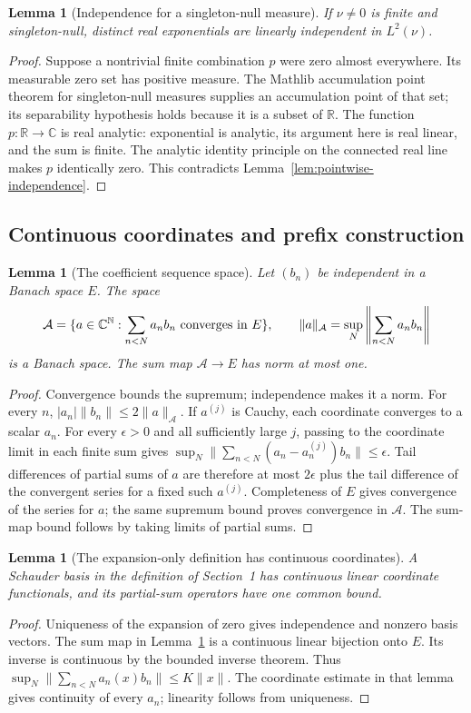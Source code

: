 \documentclass[reqno,a4paper,12pt]{amsart}
\newtheorem{lemma}[theorem]{Lemma}
\theoremstyle{definition}
\newcommand{\R}{\mathbb R}
\newcommand{\C}{\mathbb C}
\newcommand{\N}{\mathbb N}
\begin{document}
\begin{lemma}[Independence for a singleton-null measure]
\label{lem:real-independence}
If $\nu\ne0$ is finite and singleton-null, distinct real exponentials
are linearly independent in $L^2(\nu)$.
\end{lemma}
\begin{proof}
Suppose a nontrivial finite combination $p$ were zero almost everywhere.
Its measurable zero set has positive measure. The Mathlib accumulation
point theorem for singleton-null measures supplies an accumulation
point of that set; its separability hypothesis holds because it is
a subset of $\R$. The function $p:\R\to\C$ is real analytic: exponential
is analytic, its argument here is real linear, and the sum is finite.
The analytic identity principle on the connected real line makes
$p$ identically zero. This contradicts
Lemma~\ref{lem:pointwise-independence}.
\end{proof}

\subsection{Continuous coordinates and prefix construction}
\begin{lemma}[The coefficient sequence space]\label{lem:coefficient-space}
Let $(b_n)$ be independent in a Banach space $E$. The space
\[
 \mathcal A=\{a\in\C^\N:\sum_{n<N}a_nb_n
                     \hbox{ converges in }E\},\qquad
 \|a\|_{\mathcal A}=\sup_N\left\|\sum_{n<N}a_nb_n\right\|
\]
is a Banach space. The sum map $\mathcal A\to E$ has norm at most one.
\end{lemma}
\begin{proof}
Convergence bounds the supremum; independence makes it a norm.
For every $n$, $|a_n|\|b_n\|\le2\|a\|_{\mathcal A}$.
If $a^{(j)}$ is Cauchy, each coordinate converges to a scalar $a_n$.
For every $\epsilon>0$ and all sufficiently large $j$, passing to
the coordinate limit in each finite sum gives
$\sup_N\|\sum_{n<N}(a_n-a_n^{(j)})b_n\|\le\epsilon$.
Tail differences of partial sums of $a$ are therefore at most
$2\epsilon$ plus the tail difference of the convergent series for
a fixed such $a^{(j)}$. Completeness of $E$ gives convergence of the
series for $a$; the same supremum bound proves convergence in
$\mathcal A$. The sum-map bound follows by taking limits of partial sums.
\end{proof}

\begin{lemma}[The expansion-only definition has continuous coordinates]
\label{lem:coordinate-continuity}
A Schauder basis in the definition of Section~1 has continuous linear
coordinate functionals, and its partial-sum operators have one common
bound.
\end{lemma}
\begin{proof}
Uniqueness of the expansion of zero gives independence and nonzero
basis vectors. The sum map in Lemma~\ref{lem:coefficient-space} is a
continuous linear bijection onto $E$. Its inverse is continuous by
the bounded inverse theorem. Thus
$\sup_N\|\sum_{n<N}a_n(x)b_n\|\le K\|x\|$.
The coordinate estimate in that lemma gives continuity of every $a_n$;
linearity follows from uniqueness.
\end{proof}
\end{document}
